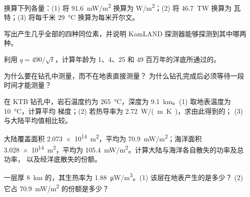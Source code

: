 \begin{exercise}[$\star$]\label{exo:g12:internal-heat:2}
换算下列各量：(1) 将 \qty{91.6}{mW/m^2} 换算为 \unit{W/m^2}；(2) 将 \qty{46.7}{TW} 换算为
瓦特；(3) 将每千米 \qty{29}{\celsius} 换算为每米开尔文。
\end{exercise}

\begin{exercise}[$\star$]\label{exo:g12:internal-heat:3}
写出产生几乎全部的四种同位素，并说明
KamLAND 探测器能够探测到其中哪两种。
\end{exercise}

\begin{exercise}[$\star$]\label{exo:g12:internal-heat:4}
利用 $q = 490/\sqrt{t}$，计算年龄为
1、4、25 和 49 百万年的洋底所通过的。
\end{exercise}

\begin{exercise}[$\star$]\label{exo:g12:internal-heat:5}
为什么要在钻孔中测量，而不在地表直接测量？
为什么钻孔完成后必须等待一段时间才能测量？
\end{exercise}

\begin{exercise}[$\star\star$]\label{exo:g12:internal-heat:6}
在 KTB 钻孔中，岩石温度约为
\qty{265}{\celsius}，深度为 \qty{9.1}{km}。(1) 取地表温度为 \qty{10}{\celsius}，计算平均
梯度；(2) 若热导率为 \qty{2.72}{W/(m.K)}，求由此得到的；
(3) 与大陆平均值相比较。
\end{exercise}

\begin{exercise}[$\star\star$]\label{exo:g12:internal-heat:7}
大陆覆盖面积 \qty{2.073e14}{m^2}，平均为
\qty{70.9}{mW/m^2}；海洋面积 \qty{3.028e14}{m^2}，平均为
\qty{105.4}{mW/m^2}。计算大陆与海洋各自散失的功率及总功率，
以及经洋底散失的份额。
\end{exercise}

\begin{exercise}[$\star\star$]\label{exo:g12:internal-heat:8}
一层厚 \qty{8}{km} 的，其生热率为
\qty{1.88}{\micro W/m^3}。(1) 该层在地表产生的是多少？
(2) 它占 \qty{70.9}{mW/m^2} 的份额是多少？
\end{exercise}

